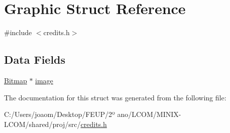 \hypertarget{struct_graphic}{}\section{Graphic Struct Reference}
\label{struct_graphic}


{\ttfamily \#include $<$credits.\+h$>$}

\subsection*{Data Fields}
\begin{DoxyCompactItemize}
\item 
\mbox{\hyperlink{struct_bitmap}{Bitmap}} $\ast$ \mbox{\hyperlink{group__credits_ga801bef0ab9d72c95bc5d6d6a0d8f2db0}{image}}
\end{DoxyCompactItemize}


The documentation for this struct was generated from the following file\+:\begin{DoxyCompactItemize}
\item 
C\+:/\+Users/joaom/\+Desktop/\+F\+E\+U\+P/2º ano/\+L\+C\+O\+M/\+M\+I\+N\+I\+X-\/\+L\+C\+O\+M/shared/proj/src/\mbox{\hyperlink{credits_8h}{credits.\+h}}\end{DoxyCompactItemize}
